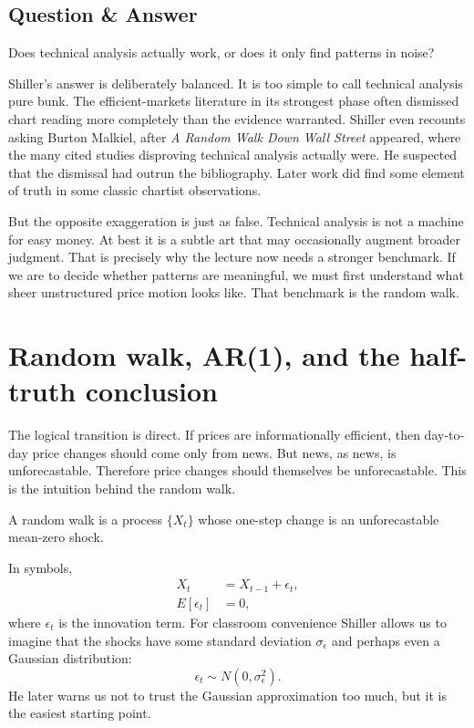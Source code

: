 \subsection{Question \& Answer}

Does technical analysis actually work, or does it only find patterns in noise?

Shiller's answer is deliberately balanced. It is too simple to call technical analysis pure bunk. The efficient-markets literature in its strongest phase often dismissed chart reading more completely than the evidence warranted. Shiller even recounts asking Burton Malkiel, after \emph{A Random Walk Down Wall Street} appeared, where the many cited studies disproving technical analysis actually were. He suspected that the dismissal had outrun the bibliography. Later work did find some element of truth in some classic chartist observations.

But the opposite exaggeration is just as false. Technical analysis is not a machine for easy money. At best it is a subtle art that may occasionally augment broader judgment. That is precisely why the lecture now needs a stronger benchmark. If we are to decide whether patterns are meaningful, we must first understand what sheer unstructured price motion looks like. That benchmark is the random walk.

\section{Random walk, AR(1), and the half-truth conclusion}

The logical transition is direct. If prices are informationally efficient, then day-to-day price changes should come only from news. But news, as news, is unforecastable. Therefore price changes should themselves be unforecastable. This is the intuition behind the random walk.

\begin{definition}
A random walk is a process \(\{X_t\}\) whose one-step change is an unforecastable mean-zero shock.
\end{definition}

In symbols,
\begin{align}
X_t &= X_{t-1} + \epsilon_t, \\
E[\epsilon_t] &= 0,
\end{align}
where \(\epsilon_t\) is the innovation term. For classroom convenience Shiller allows us to imagine that the shocks have some standard deviation \(\sigma_\epsilon\) and perhaps even a Gaussian distribution:
\begin{equation}
\epsilon_t \sim N(0,\sigma_\epsilon^2).
\end{equation}
He later warns us not to trust the Gaussian approximation too much, but it is the easiest starting point.

